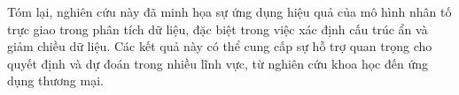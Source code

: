 Tóm lại, nghiên cứu này đã minh họa sự ứng dụng hiệu quả của mô hình nhân tố trực giao trong phân tích dữ liệu, đặc biệt trong việc xác định cấu trúc ẩn và giảm chiều dữ liệu. Các kết quả này có thể cung cấp sự hỗ trợ quan trọng cho quyết định và dự đoán trong nhiều lĩnh vực, từ nghiên cứu khoa học đến ứng dụng thương mại.

